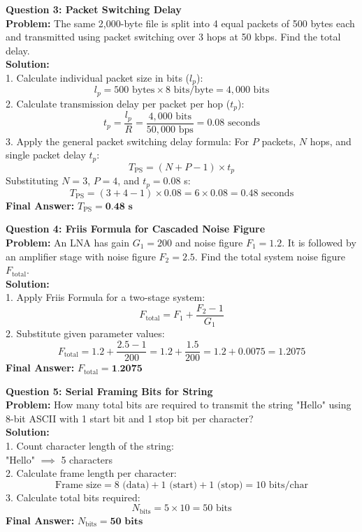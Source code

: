 \documentclass[12pt,a4paper]{report}
\begin{document}
\textbf{Question 3: Packet Switching Delay} \\
\textbf{Problem:} The same 2,000-byte file is split into 4 equal packets of 500 bytes each and transmitted using packet switching over 3 hops at 50 kbps. Find the total delay. \\
\textbf{Solution:} \\
1. Calculate individual packet size in bits ($l_p$):
\[ l_p = 500 \text{ bytes} \times 8 \text{ bits/byte} = 4,000 \text{ bits} \]
2. Calculate transmission delay per packet per hop ($t_p$):
\[ t_p = \frac{l_p}{R} = \frac{4,000 \text{ bits}}{50,000 \text{ bps}} = 0.08 \text{ seconds} \]
3. Apply the general packet switching delay formula: For $P$ packets, $N$ hops, and single packet delay $t_p$:
\[ T_{\text{PS}} = (N + P - 1) \times t_p \]
Substituting $N = 3$, $P = 4$, and $t_p = 0.08$ s:
\[ T_{\text{PS}} = (3 + 4 - 1) \times 0.08 = 6 \times 0.08 = 0.48 \text{ seconds} \]
\textbf{Final Answer:} $T_{\text{PS}} = \textbf{0.48 s}$
\vspace{0.5cm}

\textbf{Question 4: Friis Formula for Cascaded Noise Figure} \\
\textbf{Problem:} An LNA has gain $G_1 = 200$ and noise figure $F_1 = 1.2$. It is followed by an amplifier stage with noise figure $F_2 = 2.5$. Find the total system noise figure $F_{\text{total}}$. \\
\textbf{Solution:} \\
1. Apply Friis Formula for a two-stage system:
\[ F_{\text{total}} = F_1 + \frac{F_2 - 1}{G_1} \]
2. Substitute given parameter values:
\[ F_{\text{total}} = 1.2 + \frac{2.5 - 1}{200} = 1.2 + \frac{1.5}{200} = 1.2 + 0.0075 = 1.2075 \]
\textbf{Final Answer:} $F_{\text{total}} = \textbf{1.2075}$
\vspace{0.5cm}

\textbf{Question 5: Serial Framing Bits for String} \\
\textbf{Problem:} How many total bits are required to transmit the string "Hello" using 8-bit ASCII with 1 start bit and 1 stop bit per character? \\
\textbf{Solution:} \\
1. Count character length of the string: \\
"Hello" $\implies$ 5 characters \\
2. Calculate frame length per character:
\[ \text{Frame size} = 8 \text{ (data)} + 1 \text{ (start)} + 1 \text{ (stop)} = 10 \text{ bits/char} \]
3. Calculate total bits required:
\[ N_{\text{bits}} = 5 \times 10 = 50 \text{ bits} \]
\textbf{Final Answer:} $N_{\text{bits}} = \textbf{50 bits}$
\vspace{0.5cm}
\end{document}
